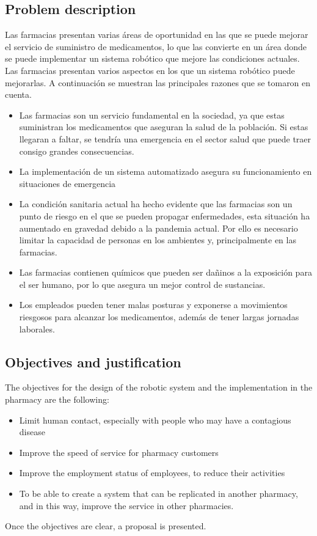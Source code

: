 \documentclass{article}
\begin{document}
\begin{multicols}{2} %
\section*{Problem description}\label{seccion}  
Las farmacias presentan varias áreas de oportunidad en las que se puede mejorar el servicio de suministro de medicamentos, lo que las convierte en un área donde se puede implementar un sistema robótico que mejore las condiciones actuales.
Las farmacias presentan varios aspectos en los que un sistema robótico puede mejorarlas. A continuación se muestran las principales razones que se tomaron en cuenta.
\begin{itemize}
	\item Las farmacias son un servicio fundamental en la sociedad, ya que estas suministran los medicamentos que aseguran la salud de la población. Si estas llegaran a faltar, se tendría una emergencia en el sector salud que puede traer consigo grandes consecuencias.
	\item La implementación de un sistema automatizado asegura su funcionamiento en situaciones de emergencia
	\item La condición sanitaria actual ha hecho evidente que las farmacias son un punto de riesgo en el que se pueden propagar enfermedades, esta situación ha aumentado en gravedad debido a la pandemia actual. Por ello es necesario limitar la capacidad de personas en los ambientes y, principalmente en las farmacias. 
	\item Las farmacias contienen químicos que pueden ser dañinos a la exposición para el ser humano, por lo que asegura un mejor control de sustancias.
	\item Los empleados pueden tener malas posturas y exponerse a movimientos riesgosos para alcanzar los medicamentos, además de tener largas jornadas laborales.
\end{itemize}




\subsection*{Objectives and justification}\label{subseccion}      

% 
The objectives for the design of the robotic system and the implementation in the pharmacy are the following:
\begin{itemize}
\item Limit human contact, especially with people who may have a contagious disease
\item Improve the speed of service for pharmacy customers
\item Improve the employment status of employees, to reduce their activities
\item To be able to create a system that can be replicated in another pharmacy, and in this way, improve the service in other pharmacies.
\end{itemize}
Once the objectives are clear, a proposal is presented.


\end{multicols}
\end{document}
